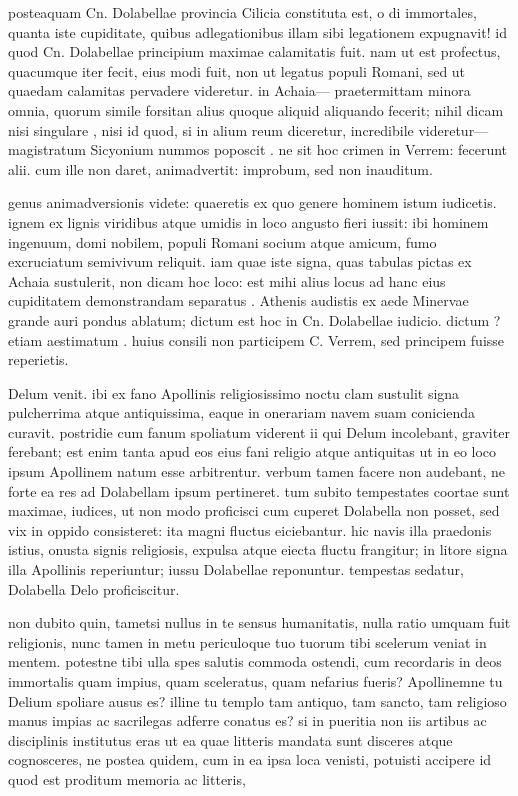  posteaquam Cn. Dolabellae provincia Cilicia constituta est, o di immortales, quanta iste cupiditate, quibus adlegationibus illam sibi legationem expugnavit! id quod Cn. Dolabellae principium maximae calamitatis fuit. nam ut est profectus, quacumque iter fecit, eius modi fuit, non ut legatus populi Romani, sed ut quaedam calamitas pervadere videretur. in Achaia— praetermittam minora omnia, quorum simile forsitan alius quoque aliquid aliquando fecerit; nihil dicam nisi singulare , nisi id quod, si in alium reum diceretur, incredibile videretur—magistratum Sicyonium nummos poposcit . ne sit hoc crimen in Verrem: fecerunt alii. cum ille non daret, animadvertit: improbum, sed non inauditum.

 genus animadversionis videte: quaeretis ex quo genere hominem istum iudicetis. ignem ex lignis viridibus atque umidis in loco angusto fieri iussit: ibi hominem ingenuum, domi nobilem, populi Romani socium atque amicum, fumo excruciatum semivivum reliquit. iam quae iste signa, quas tabulas pictas ex Achaia sustulerit, non dicam hoc loco: est mihi alius locus ad hanc eius cupiditatem demonstrandam separatus . Athenis audistis ex aede Minervae grande auri pondus ablatum; dictum est hoc in Cn. Dolabellae iudicio. dictum ? etiam aestimatum . huius consili non participem C. Verrem, sed principem fuisse reperietis.

 Delum venit. ibi ex fano Apollinis religiosissimo noctu clam sustulit signa pulcherrima atque antiquissima, eaque in onerariam navem suam conicienda curavit. postridie cum fanum spoliatum viderent ii qui Delum incolebant, graviter ferebant; est enim tanta apud eos eius fani religio atque antiquitas ut in eo loco ipsum Apollinem natum esse arbitrentur. verbum tamen facere non audebant, ne forte ea res ad Dolabellam ipsum pertineret. tum subito tempestates coortae sunt maximae, iudices, ut non modo proficisci cum cuperet Dolabella non posset, sed vix in oppido consisteret: ita magni fluctus eiciebantur. hic navis illa praedonis istius, onusta signis religiosis, expulsa atque eiecta fluctu frangitur; in litore signa illa Apollinis reperiuntur; iussu Dolabellae reponuntur. tempestas sedatur, Dolabella Delo proficiscitur.

 non dubito quin, tametsi nullus in te sensus humanitatis, nulla ratio umquam fuit religionis, nunc tamen in metu periculoque tuo tuorum tibi scelerum veniat in mentem. potestne tibi ulla spes salutis commoda ostendi, cum recordaris in deos immortalis quam impius, quam sceleratus, quam nefarius fueris? Apollinemne tu Delium spoliare ausus es? illine tu templo tam antiquo, tam sancto, tam religioso manus impias ac sacrilegas adferre conatus es? si in pueritia non iis artibus ac disciplinis institutus eras ut ea quae litteris mandata sunt disceres atque cognosceres, ne postea quidem, cum in ea ipsa loca venisti, potuisti accipere id quod est proditum memoria ac litteris,

